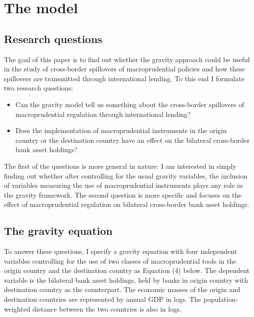 \documentclass[12pt,a4paper]{article}
\begin{document}
\cleardoublepage
\newpage
\section{The model}

\subsection{Research questions}

The goal of this paper is to find out whether the gravity approach could be useful in the study of cross-border spillovers of macroprudential policies and how these spillovers are transmitted through international lending. To this end I formulate two research questions: 

\begin{itemize}
\item Can the gravity model tell us something about the cross-border spillovers of macroprudential regulation through international lending?
\item Does the implementation of macroprudential instruments in the origin country or the destination country have an effect on the bilateral cross-border bank asset holdings?
\end{itemize}

The first of the questions is more general in nature: I am interested in simply finding out whether after controlling for the usual gravity variables, the inclusion of variables measuring the use of macroprudential instruments plays any role in the gravity framework. The second question is more specific and focuses on the effect of macroprudential regulation on bilateral cross-border bank asset holdings. 

\subsection{The gravity equation}

To answer these questions, I specify a gravity equation with four independent variables controlling for the use of two classes of macroprudential tools in the origin country and the destination country as Equation (4) below. The dependent variable is the bilateral bank asset holdings, held by banks in origin country with destination country as the counterpart. The economic masses of the origin and destination countries are represented by annual GDP in logs. The population-weighted distance between the two countries is also in logs. 
\end{document}

